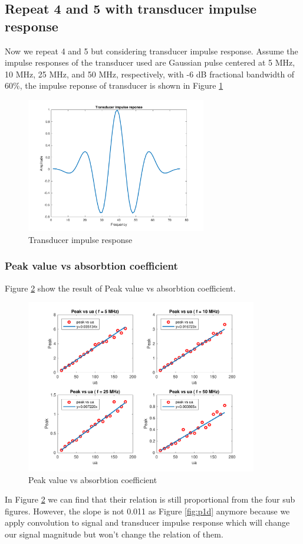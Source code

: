 \documentclass{article}
\begin{document}
\subsection{Repeat 4 and 5 with transducer impulse response}
Now we repeat 4 and 5 but considering transducer impulse response. Assume the impulse responses of the transducer used are 
Gaussian pulse centered at 5 MHz, 10 MHz, 25 MHz, and 50 MHz, respectively, with -6 dB fractional bandwidth of 60\%, the impulse
reponse of transducer is shown in Figure \ref{fig:p1f-tx}
\begin{figure}[H]
    \centering
    \includegraphics[width=0.7\textwidth]{src/p1f-tx.pdf}
    \caption{Transducer impulse response}
    \label{fig:p1f-tx}
\end{figure}

\subsubsection{Peak value vs absorbtion coefficient}
Figure \ref{fig:p1f-1} show the result of Peak value vs absorbtion coefficient.
\begin{figure}[H]
    \centering
    \includegraphics[width=0.9\textwidth]{src/p1f-1.pdf}
    \caption{Peak value vs absorbtion coefficient}
    \label{fig:p1f-1}
\end{figure}
In Figure \ref{fig:p1f-1} we can find that their relation is still proportional from the four sub figures. However, the slope is 
not 0.011 as Figure \ref{fig:p1d} anymore because we apply convolution to signal and transducer impulse response which will change 
our signal magnitude but won't change the relation of them.
\end{document}
